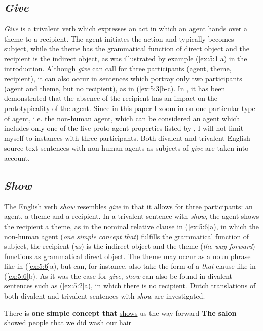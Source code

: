 \documentclass[output=paper]{LSP/langsci}
\begin{document}
\subsection{\textit{Give}}

\textit{Give} is a trivalent verb which expresses an act in which an agent hands over a theme to a recipient. The agent initiates the action and typically becomes subject, while the theme has the grammatical function of direct object and the recipient is the indirect object, as was illustrated by example (\ref{ex:5:1}a) in the introduction. Although \textit{give} can call for three participants (agent, theme, recipient), it can also occur in sentences which portray only two participants (agent and theme, but no recipient), as in (\ref{ex:5:3}b-c). In , it has been demonstrated that the absence of the recipient has an impact on the prototypicality of the agent. Since in this paper I zoom in on one particular type of agent, i.e. the non-human agent, which can be considered an agent which includes only one of  the five proto-agent properties listed by \citet{Dowty1991}, I will not limit myself to instances with three participants. Both divalent and trivalent English source-text sentences with non-human agents as subjects of \textit{give} are taken into account.

\subsection{\textit{Show}}

The English verb \textit{show} resembles \textit{give} in that it allows for three participants: an agent, a theme and a recipient. In a trivalent sentence with \textit{show}, the agent shows the recipient a theme, as in the nominal relative clause in (\ref{ex:5:6}a), in which the non-human agent (\textit{one simple concept that}) fulfills the grammatical function of subject, the recipient (\textit{us}) is the indirect object and the theme (\textit{the way forward}) functions as grammatical direct object. The theme may occur as a noun phrase like in (\ref{ex:5:6}a), but can, for instance, also take the form of a \textit{that}-clause like in (\ref{ex:5:6}b). As it was the case for \textit{give}, \textit{show} can also be found in divalent sentences such as (\ref{ex:5:2}a), in which there is no recipient. Dutch translations of both divalent and trivalent sentences with \textit{show} are investigated.

\ea \label{ex:5:6}
\ea There is \textbf{one simple concept that} \ul{shows} us the way forward
\ex \textbf{The salon} \ul{showed} people that we did wash our hair
\z
\z
\end{document}
